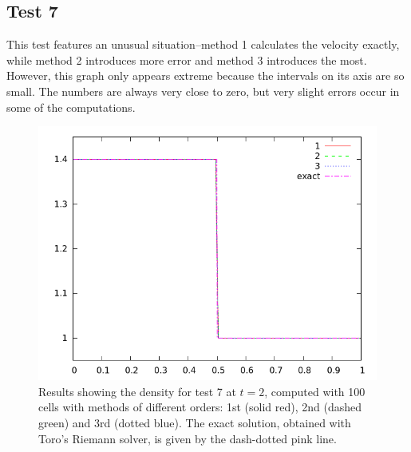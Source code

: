 \documentclass[10pt]{article}
\begin{document}
\clearpage

\subsection{Test 7}
This test features an unusual situation--method 1 calculates the velocity exactly, while method 2 introduces more error and method 3 introduces the most. However, this graph only appears extreme because the intervals on its axis are so small. The numbers are always very close to zero, but very slight errors occur in some of the computations. 

\begin{figure}[h]
  \begin{center}
     \includegraphics[width=.78\textwidth]{den_T7.png}	
  \end{center}
  \caption{Results showing the density for test 7 at $t=2$, computed with 100 cells with methods of different orders: 1st (solid red), 2nd (dashed green) and 3rd (dotted blue). The exact solution, obtained with Toro's Riemann solver, is given by the dash-dotted pink line.}
  \label{fig:den_T7}
\end{figure}
\end{document}

